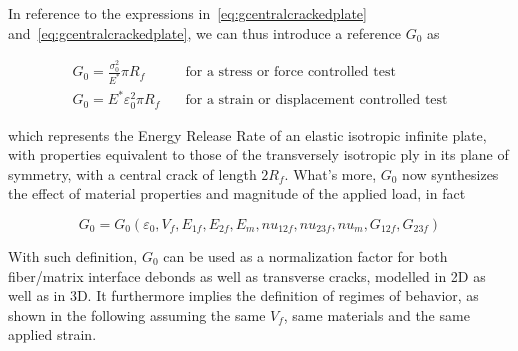 \documentclass[a4paper]{jpconf}
\begin{document}
In reference to the expressions in~\ref{eq:gcentralcrackedplate} and~\ref{eq:gcentralcrackedplate}, we can thus introduce a reference $G_{0}$ as

\begin{equation}
\begin{split}
G_{0}=\frac{\sigma_{0}^{2}}{E^{*}}\pi R_{f}\quad&\text{for a stress or force controlled test}\\[5pt]
G_{0}=E^{*}\varepsilon_{0}^{2}\pi R_{f}\quad&\text{for a strain or displacement controlled test}
\end{split}
\end{equation}

which represents the Energy Release Rate of an elastic isotropic infinite plate, with properties equivalent to those of the transversely isotropic ply in its plane of symmetry, with a central crack of length $2R_{f}$. What's more, $G_{0}$ now synthesizes the effect of material properties and magnitude of the applied load, in fact

\begin{equation}
G_{0}=G_{0}\left(\varepsilon_{0},V_{f},E_{1f},E_{2f},E_{m},nu_{12f},nu_{23f},nu_{m},G_{12f},G_{23f}\right)
\end{equation}

With such definition, $G_{0}$ can be used as a normalization factor for both fiber/matrix interface debonds as well as transverse cracks, modelled in 2D as well as in 3D. It furthermore implies the definition of regimes of behavior, as shown in the following assuming the same $V_{f}$, same materials and the same applied strain.
\end{document}
